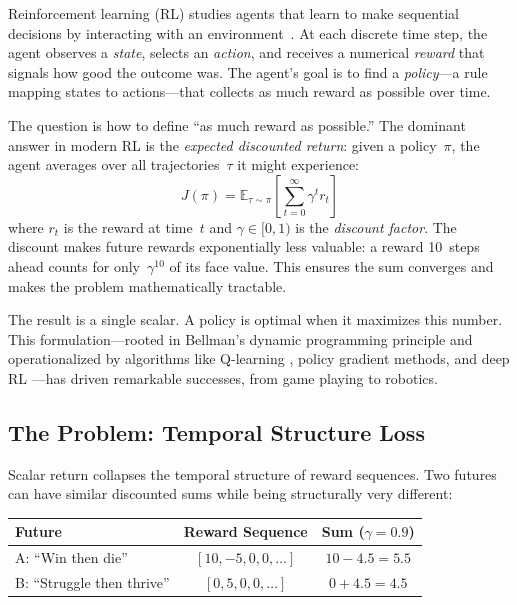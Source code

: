 \documentclass[runningheads]{llncs}
\begin{document}
Reinforcement learning (RL) studies agents that learn to make sequential decisions by interacting with an environment~\cite{Sutton2018}.  At each discrete time step, the agent observes a \emph{state}, selects an \emph{action}, and receives a numerical \emph{reward} that signals how good the outcome was.  The agent's goal is to find a \emph{policy}---a rule mapping states to actions---that collects as much reward as possible over time.

The question is how to define ``as much reward as possible.''  The dominant answer in modern RL is the \emph{expected discounted return}: given a policy~$\pi$, the agent averages over all trajectories~$\tau$ it might experience:
\[
J(\pi) = \mathbb{E}_{\tau \sim \pi} \left[ \sum_{t=0}^{\infty} \gamma^t r_t \right]
\]
where $r_t$ is the reward at time~$t$ and $\gamma \in [0,1)$ is the \emph{discount factor}.  The discount makes future rewards exponentially less valuable: a reward 10~steps ahead counts for only~$\gamma^{10}$ of its face value.  This ensures the sum converges and makes the problem mathematically tractable.

The result is a single scalar.  A policy is optimal when it maximizes this number.  This formulation---rooted in Bellman's dynamic programming principle \cite{Bellman1957} and operationalized by algorithms like Q-learning \cite{Watkins1992}, policy gradient methods, and deep RL \cite{Mnih2015}---has driven remarkable successes, from game playing to robotics.

\subsection{The Problem: Temporal Structure Loss}

Scalar return collapses the temporal structure of reward sequences.  Two futures can have similar discounted sums while being structurally very different:

\begin{center}
\begin{tabular}{lcc}
\textbf{Future} & \textbf{Reward Sequence} & \textbf{Sum ($\gamma{=}0.9$)} \\
\hline
A: ``Win then die'' & $[10, -5, 0, 0, \ldots]$ & $10 - 4.5 = 5.5$ \\
B: ``Struggle then thrive'' & $[0, 5, 0, 0, \ldots]$ & $0 + 4.5 = 4.5$ \\
\end{tabular}
\end{center}
\end{document}
